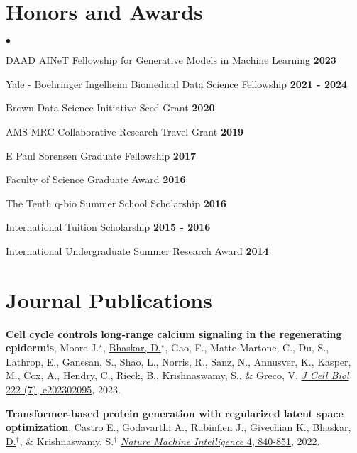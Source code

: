 \documentclass[margin,line]{res}
\newenvironment{list2}{
  \begin{list}{$\bullet$}{
      \setlength{\itemsep}{0in}
      \setlength{\parsep}{0in} \setlength{\parskip}{0in}
      \setlength{\topsep}{0in} \setlength{\partopsep}{0in}
      \setlength{\leftmargin}{0.2in}}}{\end{list}}
\begin{document}
\begin{resume}
\vspace*{.12cm}

\section{\sc Honors and Awards}
\begin{list2}
\setlength\itemsep{0.25em}
\item DAAD AINeT Fellowship for Generative Models in Machine Learning \hfill {\bf 2023}
\item Yale - Boehringer Ingelheim Biomedical Data Science Fellowship \hfill {\bf 2021 - 2024}
\item Brown Data Science Initiative Seed Grant \hfill {\bf 2020}
\item AMS MRC Collaborative Research Travel Grant \hfill {\bf 2019}
\item E Paul Sorensen Graduate Fellowship \hfill {\bf 2017}
\item Faculty of Science Graduate Award \hfill {\bf 2016}
\item The Tenth q-bio Summer School Scholarship \hfill {\bf 2016}
\item International Tuition Scholarship \hfill {\bf 2015 - 2016}
\item International Undergraduate Summer Research Award \hfill {\bf 2014}
\end{list2}

\section{\sc Journal Publications}
{
\renewcommand\leftmargini{0em}
\renewcommand{\labelenumi}{J\theenumi}
\begin{etaremune}[start=9]
\item{\bf Cell cycle controls long-range calcium signaling in the regenerating epidermis}, 
Moore J.$^\star$, \underline{Bhaskar, D.}$^\star$, Gao, F., Matte-Martone, C., Du, S., Lathrop, E., Ganesan, S., Shao, L., Norris, R., Sanz, N., Annusver, K., Kasper, M., Cox, A., Hendry, C., Rieck, B., Krishnaswamy, S., \& Greco, V.
\href{https://doi.org/10.1083/jcb.202302095}{\textit{J Cell Biol} 222 (7), e202302095}, 2023.
\vspace*{.1cm}
\item{\bf Transformer-based protein generation with regularized latent space optimization}, 
Castro E., Godavarthi A., Rubinfien J., Givechian K., \underline{Bhaskar, D.}$^\dagger$, \& Krishnaswamy, S.$^\dagger$
\href{https://doi.org/10.1039/D1SM00072A}{\textit{Nature Machine Intelligence} 4, 840-851}, 2022.
\end{etaremune}
} 


\end{resume}
\end{document}
